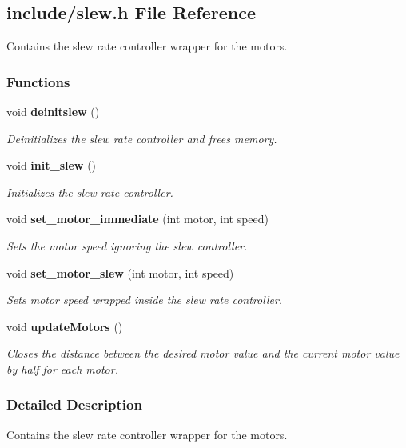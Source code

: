 \subsection{include/slew.h File Reference}
\label{slew_8h}


Contains the slew rate controller wrapper for the motors.  


\subsubsection*{Functions}
\begin{DoxyCompactItemize}
\item 
void \textbf{ deinitslew} ()
\begin{DoxyCompactList}\small\item\em Deinitializes the slew rate controller and frees memory. \end{DoxyCompactList}\item 
void \textbf{ init\+\_\+slew} ()
\begin{DoxyCompactList}\small\item\em Initializes the slew rate controller. \end{DoxyCompactList}\item 
void \textbf{ set\+\_\+motor\+\_\+immediate} (int motor, int speed)
\begin{DoxyCompactList}\small\item\em Sets the motor speed ignoring the slew controller. \end{DoxyCompactList}\item 
void \textbf{ set\+\_\+motor\+\_\+slew} (int motor, int speed)
\begin{DoxyCompactList}\small\item\em Sets motor speed wrapped inside the slew rate controller. \end{DoxyCompactList}\item 
void \textbf{ update\+Motors} ()
\begin{DoxyCompactList}\small\item\em Closes the distance between the desired motor value and the current motor value by half for each motor. \end{DoxyCompactList}\end{DoxyCompactItemize}


\subsubsection{Detailed Description}
Contains the slew rate controller wrapper for the motors. 


